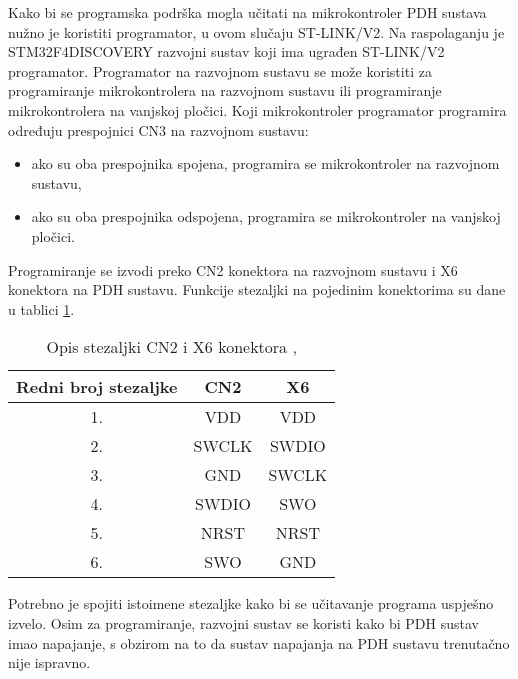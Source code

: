 Kako bi se programska podrška mogla učitati na mikrokontroler PDH sustava nužno je koristiti programator, u ovom slučaju ST-LINK/V2. Na raspolaganju je \\ STM32F4DISCOVERY razvojni sustav koji ima ugrađen ST-LINK/V2 programator. Programator na razvojnom sustavu se može koristiti za programiranje mikrokontrolera na razvojnom sustavu ili programiranje mikrokontrolera na vanjskoj pločici. Koji mikrokontroler programator programira određuju prespojnici CN3 na razvojnom sustavu:
\begin{itemize}
	\item ako su oba prespojnika spojena, programira se mikrokontroler na razvojnom sustavu,
	\item ako su oba prespojnika odspojena, programira se mikrokontroler na vanjskoj pločici.
\end{itemize}
Programiranje se izvodi preko CN2 konektora na razvojnom sustavu i X6 konektora na PDH sustavu. Funkcije stezaljki na pojedinim konektorima su dane u tablici \ref{Tab:conn_func}.
\begin{center}
	\begin{table}[H]
		\centering
		\caption{Opis stezaljki CN2 i X6 konektora \cite{zavrsni_filip_juric}, \cite{disc_manual}}
		\begin{tabular}{| c | c | c |}
			\hline
			Redni broj stezaljke & CN2 & X6 \\
			\hline
			1. & VDD & VDD \\
			\hline
			2. & SWCLK & SWDIO \\
			\hline
			3. & GND & SWCLK \\
			\hline
			4. & SWDIO & SWO \\
			\hline
			5. & NRST & NRST \\
			\hline
			6. & SWO & GND \\
			\hline
		\end{tabular}
		\label{Tab:conn_func}
	\end{table}
\end{center}
Potrebno je spojiti istoimene stezaljke kako bi se učitavanje programa uspješno izvelo. Osim za programiranje, razvojni sustav se koristi kako bi PDH sustav imao napajanje, s obzirom na to da sustav napajanja na PDH sustavu trenutačno nije ispravno.